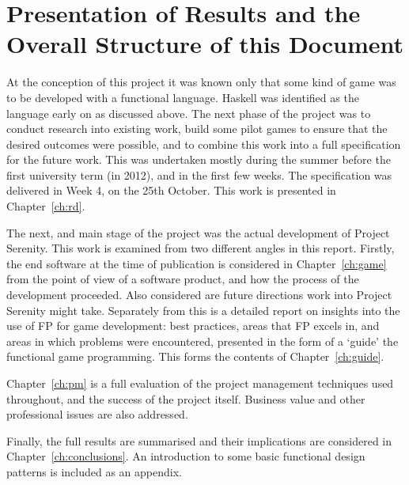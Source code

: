 \section{Presentation of Results and the Overall Structure of this Document}

At the conception of this project it was known only that some kind of game was to be developed with a functional language. Haskell was identified as the language early on as discussed above. The next phase of the project was to conduct research into existing work, build some pilot games to ensure that the desired outcomes were possible, and to combine this work into a full specification for the future work. This was undertaken mostly during the summer before the first university term (in 2012), and in the first few weeks. The specification was delivered in Week 4, on the 25th October. This work is presented in Chapter~\ref{ch:rd}.

The next, and main stage of the project was the actual development of Project Serenity. This work is examined from two different angles in this report. Firstly, the end software at the time of publication is considered in Chapter~\ref{ch:game} from the point of view of a software product, and how the process of the development proceeded. Also considered are future directions work into Project Serenity might take. Separately from this is a detailed report on insights into the use of FP for game development: best practices, areas that FP excels in, and areas in which problems were encountered, presented in the form of a `guide' the functional game programming. This forms the contents of Chapter~\ref{ch:guide}.

Chapter~\ref{ch:pm} is a full evaluation of the project management techniques used throughout, and the success of the project itself. Business value and other professional issues are also addressed.

Finally, the full results are summarised and their implications are considered in Chapter~\ref{ch:conclusions}. An introduction to some basic functional design patterns is included as an appendix.
